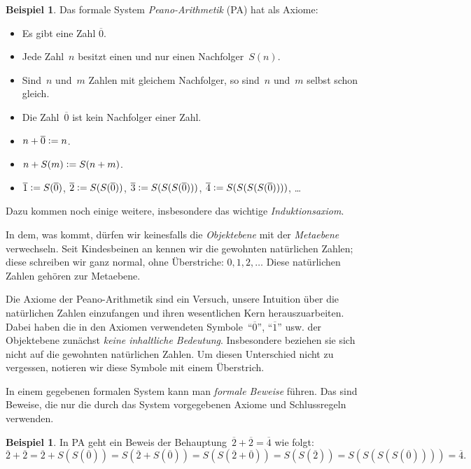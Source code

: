 \documentclass[twoside]{../zirkelblatt1415}
\theoremstyle{definition}
\newtheorem{bsp}[defn]{Beispiel}
\theoremstyle{plain}
\theoremstyle{remark}
\newcommand{\defeq}{\vcentcolon=}
\newcommand{\ol}[1]{\overline{#1}}
\begin{document}
\begin{bsp}Das formale System \emph{Peano-Arithmetik} (PA) hat als Axiome:
\begin{itemize}
\item Es gibt eine Zahl $\ol{0}$.
\item Jede Zahl~$n$ besitzt einen und nur einen Nachfolger~$S(n)$.
\item Sind~$n$ und~$m$ Zahlen mit gleichem Nachfolger, so sind~$n$ und~$m$
selbst schon gleich.
\item Die Zahl~$\ol{0}$ ist kein Nachfolger einer Zahl.
\item $n + \ol{0} \defeq n$.
\item $n + S(m) \defeq S(n+m)$.
\item $\ol{1} \defeq S(\ol{0})$, $\ol{2} \defeq S(S(\ol{0}))$, $\ol{3} \defeq S(S(S(\ol{0})))$, $\ol{4} \defeq
S(S(S(S(\ol{0}))))$, \ldots
\end{itemize}
Dazu kommen noch einige weitere, insbesondere das wichtige
\emph{Induktionsaxiom}.
\end{bsp}

In dem, was kommt, dürfen wir keinesfalls die \emph{Objektebene} mit der
\emph{Metaebene} verwechseln. Seit Kindesbeinen an kennen wir die gewohnten
natürlichen Zahlen; diese schreiben wir ganz normal, ohne Überstriche:
$0,1,2,\ldots$ Diese natürlichen Zahlen gehören zur Metaebene.

Die Axiome der Peano-Arithmetik sind ein Versuch, unsere Intuition über die
natürlichen Zahlen einzufangen und ihren wesentlichen Kern herauszuarbeiten.
Dabei haben die in den Axiomen verwendeten Symbole~"`$\ol{0}$"', "`$\ol{1}$"'
usw. der Objektebene zunächst \emph{keine inhaltliche Bedeutung}. Insbesondere
beziehen sie sich nicht auf die gewohnten natürlichen Zahlen. Um diesen
Unterschied nicht zu vergessen, notieren wir diese Symbole mit einem
Überstrich.

In einem gegebenen formalen System kann man \emph{formale Beweise} führen. Das
sind Beweise, die nur die durch das System vorgegebenen Axiome und
Schlussregeln verwenden.

\begin{bsp}In PA geht ein Beweis der Behauptung~$\ol{2} + \ol{2} = \ol{4}$ wie folgt:
\[
  \ol{2} + \ol{2} = \ol{2} + S(S(\ol{0})) = S(\ol{2} + S(\ol{0})) = S(S(\ol{2} + \ol{0})) = S(S(\ol{2})) = S(S(S(S(\ol{0})))) = \ol{4}.
\]
\end{bsp}
\end{document}
